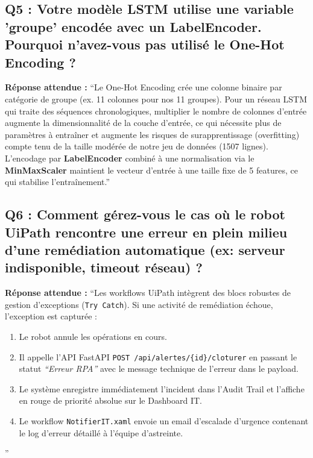 \documentclass[11pt,a4paper]{article}
\begin{document}
\subsection*{Q5 : Votre modèle LSTM utilise une variable 'groupe' encodée avec un LabelEncoder. Pourquoi n'avez-vous pas utilisé le One-Hot Encoding ?}
\begin{responsebox}
\textbf{Réponse attendue :} ``Le One-Hot Encoding crée une colonne binaire par catégorie de groupe (ex. 11 colonnes pour nos 11 groupes). Pour un réseau LSTM qui traite des séquences chronologiques, multiplier le nombre de colonnes d'entrée augmente la dimensionnalité de la couche d'entrée, ce qui nécessite plus de paramètres à entraîner et augmente les risques de surapprentissage (overfitting) compte tenu de la taille modérée de notre jeu de données (1507 lignes). L'encodage par \textbf{LabelEncoder} combiné à une normalisation via le \textbf{MinMaxScaler} maintient le vecteur d'entrée à une taille fixe de 5 features, ce qui stabilise l'entraînement.''
\end{responsebox}

\subsection*{Q6 : Comment gérez-vous le cas où le robot UiPath rencontre une erreur en plein milieu d'une remédiation automatique (ex: serveur indisponible, timeout réseau) ?}
\begin{responsebox}
\textbf{Réponse attendue :} ``Les workflows UiPath intègrent des blocs robustes de gestion d'exceptions (\texttt{Try Catch}). Si une activité de remédiation échoue, l'exception est capturée :
\begin{enumerate}
    \item Le robot annule les opérations en cours.
    \item Il appelle l'API FastAPI \texttt{POST /api/alertes/\{id\}/cloturer} en passant le statut \textit{``Erreur RPA''} avec le message technique de l'erreur dans le payload.
    \item Le système enregistre immédiatement l'incident dans l'Audit Trail et l'affiche en rouge de priorité absolue sur le Dashboard IT.
    \item Le workflow \texttt{NotifierIT.xaml} envoie un email d'escalade d'urgence contenant le log d'erreur détaillé à l'équipe d'astreinte.
\end{enumerate}''
\end{responsebox}
\end{document}
